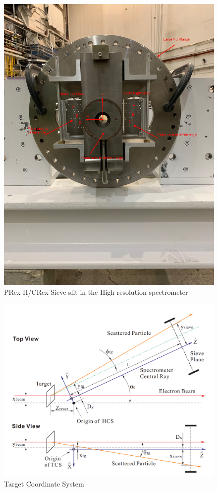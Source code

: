 \begin{figure}
    \centering
    \includegraphics[width =\textwidth]{images/chap4/sieve_in_hrs.jpg}
    \caption{PRex-II/CRex Sieve slit in the High-resolution spectrometer}
    \label{fig:labeled_sieve_in_hrs}
\end{figure}


\begin{figure}
    \centering
    \includegraphics[width =\textwidth]{images/chap4/target_coordinate_system.png}
    \caption{Target Coordinate System}
    \label{fig:target_coordinate_system_plot}
\end{figure}

